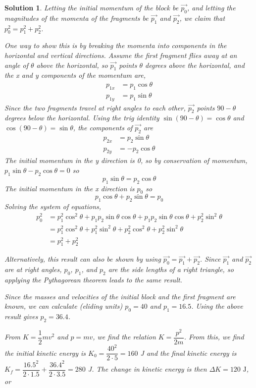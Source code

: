 \documentclass[12pt]{article}
\newtheorem*{solution}{Solution}
\theoremstyle{mystyle}
\begin{document}
\begin{solution}
    Letting the initial momentum of the block be $\vec{p_0}$, and letting the magnitudes of the momenta of the fragments be $\vec{p_1}$ and $\vec{p_2}$, we claim that $p_0^2 = p_1^2 + p_2^2$. 

    One way to show this is by breaking the momenta into components in the horizontal and vertical directions. Assume the first fragment flies away at an angle of $\theta$ above the horizontal, so $\vec{p_1}$ points $\theta$ degrees above the horizontal, and the x and y components of the momentum are,
    \begin{align*}
        p_{1x} &= p_1 \cos \theta\\
        p_{1y} &= p_1 \sin \theta
    \end{align*}
    Since the two fragments travel at right angles to each other, $\vec{p_2}$ points $90 - \theta$ degrees below the horizontal. Using the trig identity $\sin (90-\theta) = \cos \theta$ and $\cos (90-\theta) = \sin\theta$, the components of $\vec{p_2}$ are
    \begin{align*}
        p_{2x} &= p_2 \sin \theta\\
        p_{2y} &= -p_2 \cos \theta
    \end{align*}
    The initial momentum in the y direction is 0, so by conservation of momentum, $p_1 \sin \theta-p_2 \cos \theta = 0$ so $$p_1 \sin \theta = p_2 \cos \theta$$
    The initial momentum in the x direction is $p_0$ so $$p_1 \cos \theta + p_2 \sin \theta = p_0$$
    Solving the system of equations, 
    \begin{align*}
        p_0^2&=p_1^2\cos^2\theta + p_1p_2\sin\theta\cos\theta
            + p_1p_2\sin\theta\cos\theta + p_2^2\sin^2\theta\\
        &=p_1^2\cos^2\theta + p_1^2\sin^2\theta + p_2^2\cos^2\theta
            + p_2^2\sin^2\theta\\
        &=p_1^2 + p_2^2
    \end{align*}

    Alternatively, this result can also be shown by using $\vec{p_0} = \vec{p_1} + \vec{p_2}$. Since $\vec{p_1}$ and $\vec{p_2}$ are at right angles, $p_0$, $p_1$, and $p_2$ are the side lengths of a right triangle, so applying the Pythagorean theorem leads to the same result. 

    Since the masses and velocities of the initial block and the first fragment are known, we can calculate (eliding units) $p_0 = 40$ and $p_1 = 16.5$. Using the above result gives $p_2 = 36.4$.
    
    From $K = \dfrac{1}{2}mv^2$ and $p = mv$, we find the relation $K = \dfrac{p^2}{2m}$. From this, we find the initial kinetic energy is $K_0 = \dfrac{40^2}{2\cdot5} = 160$ J and the final kinetic energy is $K_f = \dfrac{16.5^2}{2\cdot1.5} + \dfrac{36.4^2}{2\cdot3.5} = 280$ J. The change in kinetic energy is then $\Delta K = 120 \text{ J}$, or 
\end{solution}
\end{document}

